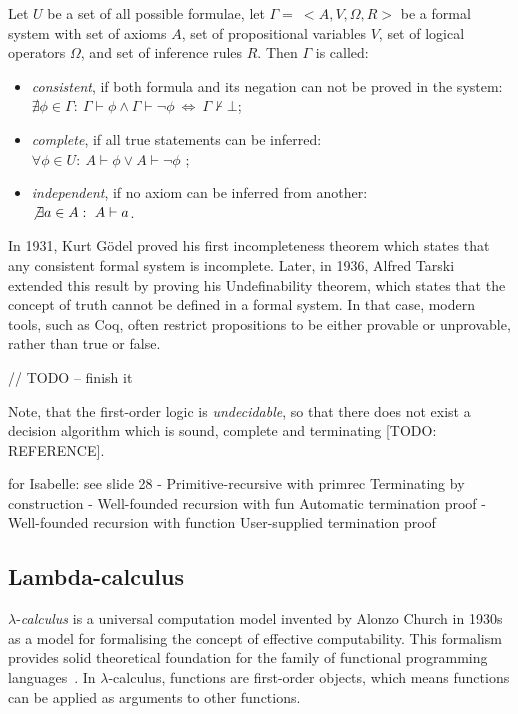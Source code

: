 \documentclass[article]{aaltoseries}
\begin{document}
Let $U$ be a set of all possible formulae, let $\Gamma = \ <A, V, \Omega, R>$ be a formal system with set of axioms $A$, set of propositional variables $V$, set of logical operators $\Omega$, and set of inference rules $R$. Then $\Gamma$ is called:
\begin{itemize}
	\itemsep0em
	\item \textit{consistent}, if both formula and its negation can not be proved in the system: \\
		$\nexists \phi \in \Gamma: \ \Gamma \vdash \phi \land \Gamma \vdash \neg \phi  \ \Leftrightarrow \ \Gamma \nvdash \bot$;
	\item \textit{complete}, if all true statements can be inferred: \\
		$\forall \phi \in U: \ A \vdash \phi \lor A \vdash \neg \phi$ ;
	\item \textit{independent}, if no axiom can be inferred from another: \\
		$\not \exists a \in A: \ A \vdash a$.
\end{itemize}

In 1931, Kurt Gödel proved his first incompleteness theorem which states that any consistent formal system is incomplete. Later, in 1936, Alfred Tarski extended this result by proving his Undefinability theorem, which states that the concept of truth cannot be defined in a formal system. %
In that case, modern tools, such as Coq, often restrict propositions to be either provable or unprovable, rather than true or false.


// TODO -- finish it


Note, that the first-order logic is \textit{undecidable}, so that there does not exist a decision algorithm which is sound, complete and terminating [TODO: REFERENCE]. %

for Isabelle: see slide 28 %
- Primitive-recursive with primrec
Terminating by construction
- Well-founded recursion with fun
Automatic termination proof
- Well-founded recursion with function
User-supplied termination proof


\subsection{Lambda-calculus}

$\lambda$-\textit{calculus} is a universal computation model invented by Alonzo Church in 1930s as a model for formalising the concept of effective computability.  This formalism provides solid theoretical foundation for the family of functional programming languages~\cite{Roj15}. In $\lambda$-calculus, functions are first-order objects, which means functions can be applied as arguments to other functions.
\end{document}
